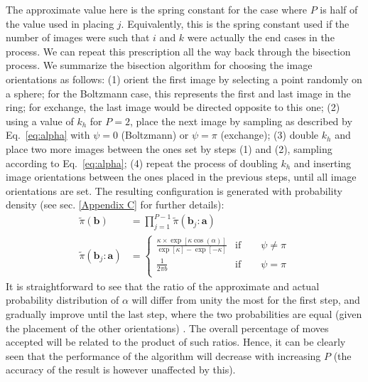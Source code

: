         The approximate value here is the spring constant for the case where $P$ is half of the value used in placing $j$. Equivalently, this is the spring constant used if the number of images were such that $i$ and $k$ were actually the end cases in the process. We can repeat this prescription all the way back through the bisection process. We summarize the bisection algorithm for choosing the image orientations as follows: (1) orient the first image by selecting a point randomly on a sphere; for the Boltzmann case, this represents the first and last image in the ring; for exchange, the last image would be directed opposite to this one; (2) using a value of $k_h$ for $P = 2$, place the next image by sampling as described by Eq.~\ref{eq:alpha} with $\psi = 0$ (Boltzmann) or $\psi = \pi$ (exchange); (3) double $k_h$ and place two more images between the ones set by steps (1) and (2), sampling according to Eq.~\ref{eq:alpha}; (4) repeat the process of doubling $k_h$ and inserting image orientations between the ones placed in the previous steps, until all image orientations are set. The resulting configuration is generated with probability density (see sec. \ref{Appendix C} for further details):
        \begin{equation}
        \label{eq:piTilde}
            \begin{aligned}
                \tilde \pi({\mathbf b}) &= \displaystyle\prod_{j=1}^{P-1} \tilde \pi({\mathbf b}_j: {\mathbf a}) \\
                \tilde \pi({\mathbf b}_j: {\mathbf a})  &= 
                \begin{cases}
                    \displaystyle\frac{\kappa \times \exp[\kappa \cos (\alpha)]}{\exp[\kappa] - \exp[-\kappa]} & \text{if} \qquad \psi \ne \pi\\
                    \displaystyle\frac{1}{2 \pi b} & \text{if} \qquad \psi = \pi\\
                \end{cases}
            \end{aligned}
        \end{equation}
        It is straightforward to see that the ratio of the approximate and actual probability distribution of $\alpha$ will differ from unity the most for the first step, and gradually improve until the last step, where the two probabilities are equal (given the placement of the other orientations) . The overall percentage of moves accepted will be related to the product of such ratios. Hence, it can be clearly seen that the performance of the algorithm will decrease with increasing $P$ (the accuracy of the result is however unaffected by this).

